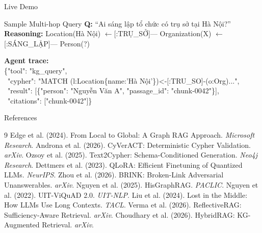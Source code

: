 \documentclass[aspectratio=169]{beamer}
\begin{document}
\begin{frame}{Live Demo}
\begin{exampleblock}{Sample Multi-hop Query}
\textbf{Q:} ``Ai sáng lập tổ chức có trụ sở tại Hà Nội?''\\[4pt]
\textbf{Reasoning:} Location(Hà Nội) $\leftarrow$[:TRỤ\_SỞ]--- Organization(X) $\leftarrow$[:SÁNG\_LẬP]--- Person(?)
\end{exampleblock}
\vspace{0.3em}
\textbf{Agent trace:}\\[3pt]
{\small\ttfamily
\{"tool": "kg\_query",\\
\ "cypher": "MATCH (l:Location\{name:'Hà Nội'\})<-[:TRU\_SO]-(o:Org)...",\\
\ "result": [\{"person": "Nguyễn Văn A", "passage\_id": "chunk-0042"\}],\\
\ "citations": ["chunk-0042"]\}
}
\end{frame}

\begin{frame}{References}
\small
\begin{thebibliography}{9}
 Edge et al. (2024). From Local to Global: A Graph RAG Approach. \textit{Microsoft Research}.
 Androna et al. (2026). CyVerACT: Deterministic Cypher Validation. \textit{arXiv}.
 Ozsoy et al. (2025). Text2Cypher: Schema-Conditioned Generation. \textit{Neo4j Research}.
 Dettmers et al. (2023). QLoRA: Efficient Finetuning of Quantized LLMs. \textit{NeurIPS}.
 Zhou et al. (2026). BRINK: Broken-Link Adversarial Unanswerables. \textit{arXiv}.
 Nguyen et al. (2025). HisGraphRAG. \textit{PACLIC}.
 Nguyen et al. (2022). UIT-ViQuAD 2.0. \textit{UIT-NLP}.
 Liu et al. (2024). Lost in the Middle: How LLMs Use Long Contexts. \textit{TACL}.
 Verma et al. (2026). ReflectiveRAG: Sufficiency-Aware Retrieval. \textit{arXiv}.
 Choudhary et al. (2026). HybridRAG: KG-Augmented Retrieval. \textit{arXiv}.
\end{thebibliography}
\end{frame}
\end{document}
